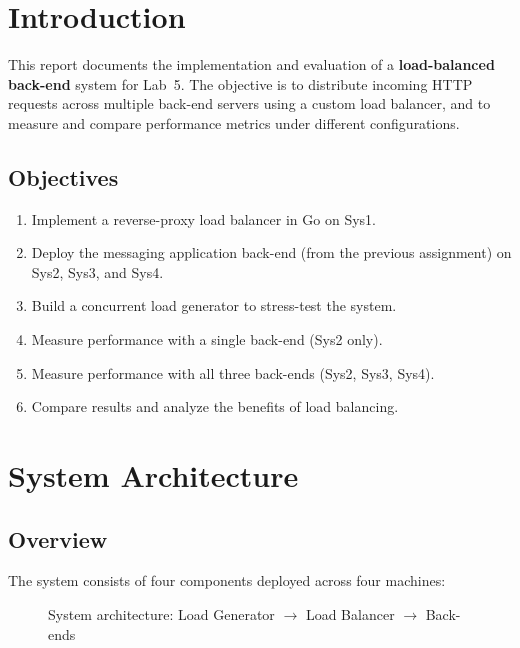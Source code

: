 \documentclass[12pt,a4paper]{article}
\begin{document}
\tableofcontents
\newpage

\section{Introduction}

This report documents the implementation and evaluation of a \textbf{load-balanced back-end} system for Lab~5. The objective is to distribute incoming HTTP requests across multiple back-end servers using a custom load balancer, and to measure and compare performance metrics under different configurations.

\subsection{Objectives}
\begin{enumerate}[leftmargin=2em]
    \item Implement a reverse-proxy load balancer in Go on Sys1.
    \item Deploy the messaging application back-end (from the previous assignment) on Sys2, Sys3, and Sys4.
    \item Build a concurrent load generator to stress-test the system.
    \item Measure performance with a single back-end (Sys2 only).
    \item Measure performance with all three back-ends (Sys2, Sys3, Sys4).
    \item Compare results and analyze the benefits of load balancing.
\end{enumerate}

\section{System Architecture}

\subsection{Overview}

The system consists of four components deployed across four machines:

\begin{figure}[H]
\centering
{}
\caption{System architecture: Load Generator $\to$ Load Balancer $\to$ Back-ends}
\label{fig:architecture}
\end{figure}
\end{document}
